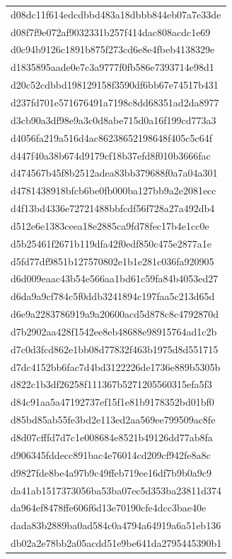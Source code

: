 \begin{tabular}{l}
d08dc11f614edcdbbd483a18dbbb844eb07a7e33de \\
d08f7f9e072af9032331b257f414dac808acdc1e69 \\
d0c94b9126c1891b875f273cd6e8e4fbeb4138329e \\
d1835895aade0e7c3a9777f0fb586e7393714e98d1 \\
d20c52cdbbd198129158f3590df6bb67e74517b431 \\
d237fd701e571676491a7198c8dd68351ad2da8977 \\
d3cb90a3df98e9a3c0d8abe715d0a16f199cd773a3 \\
d4056fa219a516d4ac86238652198648f405c5c64f \\
d447f40a38b674d9179cf18b37efd8f010b3666fac \\
d474567b45f8b2512adea83bb379688f0a7a04a301 \\
d4781438918bfcb6be0fb000ba127bb9a2e2081ecc \\
d4f13bd4336e72721488bbfcdf56f728a27a492db4 \\
d512e6e1383ceea18e2885ca9fd78fec17b4e1cc0e \\
d5b25461f2671b119dfa42f0edf850c475e2877a1e \\
d5fd77df9851b127570802e1b1e281c036fa920905 \\
d6d009eaac43b54e566aa1bd61c59fa84b4053ed27 \\
d6da9a9cf784c5f0ddb3241894c197faa5c213d65d \\
d6e9a2283786919a9a20600acd5d878c8c4792870d \\
d7b2902aa428f1542ee8eb48688e98915764ad1c2b \\
d7c0d3fcd862e1bb08d77832f463b1975d8d551715 \\
d7dc4152bb6fac7d4bd3122226de1736e889b5305b \\
d822c1b3df26258f111367b5271205560315efa5f3 \\
d84c91aa5a47192737ef15f1e81b9178352bd01bf0 \\
d85bd85ab55fe3bd2e113ed2aa569ee799509ac8fe \\
d8d07cfffd7d7c1e008684e8521b49126dd77ab8fa \\
d906345fddecc891bac4e76014cd209cf942fe8a8c \\
d9827fde8be4a97b9c49ffeb719ee16df7b9b0a9c9 \\
da41ab1517373056ba53ba07ec5d353ba23811d374 \\
da964ef8478ffe606f6d13e70190cfe4dcc3bae40e \\
dada83b2889ba0ad584c0a4794a64919a6a51eb136 \\
db02a2e78bb2a05acdd51e9be641da2795445390b1 \\

\end{tabular}
